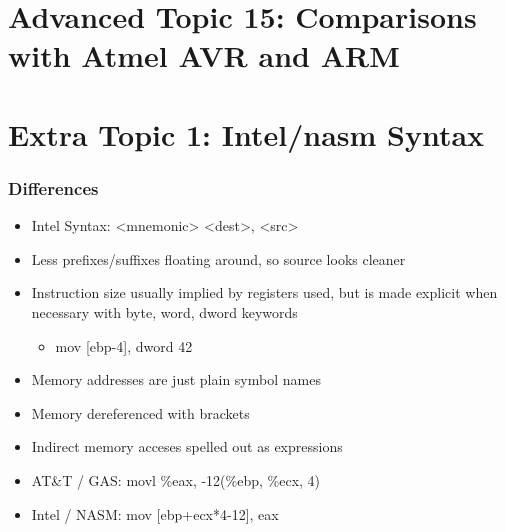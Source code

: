 \documentclass[11pt,xcolor=dvipsnames]{beamer}
\newcommand{\vs}{\vspace{0.5em}}
\begin{document}
\section{Advanced Topic 15: Comparisons with Atmel AVR and ARM}

\section{Extra Topic 1: Intel/nasm Syntax}

\begin{frame}[fragile,t]
\frametitle{Differences}
\begin{itemize}
  \item Intel Syntax: {\ttfamily <mnemonic> <dest>, <src>}
  \item Less prefixes/suffixes floating around, so source looks cleaner
  \item Instruction size usually implied by registers used, but is made explicit when necessary with {\ttfamily byte, word, dword} keywords
  \begin{itemize}
    \item {\ttfamily mov [ebp-4], dword 42}
  \end{itemize}
  \pause
  \item Memory addresses are just plain symbol names
  \item Memory dereferenced with brackets {\ttfamily [ ... ]}
  \pause
  \vs
  \item Indirect memory acceses spelled out as expressions
  \item AT\&T / GAS: {\ttfamily movl \%eax, -12(\%ebp, \%ecx, 4)}
  \item Intel / NASM: {\ttfamily mov [ebp+ecx*4-12], eax}
\end{itemize}
\end{frame}
\end{document}
